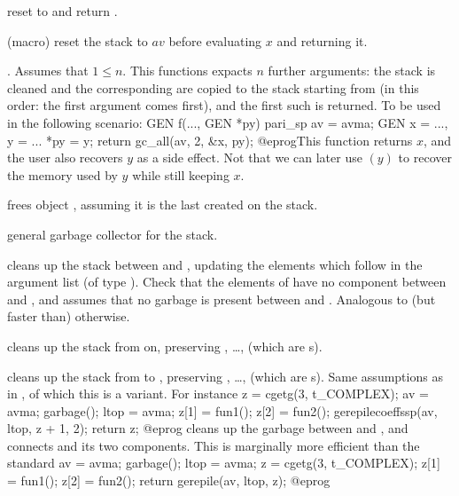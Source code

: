 reset  to  and return
.

 (macro) reset the stack to $av$
before evaluating $x$ and returning it.

. Assumes that $1 \leq n$. This
functions expacts $n$ further 
arguments: the stack is cleaned and the corresponding  are
copied to the stack starting from  (in this order: the first argument
comes first), and the first such  is returned. To be used in the
following scenario:
\bprog
  GEN f(..., GEN *py)
  {
    pari_sp av = avma;
    GEN x = ..., y = ...
    *py = y; return gc_all(av, 2, &x, py);
  }
@eprog\noindent This function returns $x$, and the user also recovers $y$
as a side effect. Not that we can later use $(y)$ to recover the
memory used by $y$ while still keeping $x$.

 frees object , assuming it is the last created
on the stack.

 general garbage collector
for the stack.

cleans up the stack between  and , updating
the  elements which follow  in the argument list (of type
). Check that the elements of  have no component between
 and , and assumes that no garbage is present between
 and . Analogous to (but faster than) 
otherwise.

 cleans up the stack
from  on, preserving , \dots,  (which are
s).

cleans up the stack from  to , preserving ,
\dots,  (which are s). Same assumptions as in
, of which this is a variant. For instance
\bprog
  z = cgetg(3, t_COMPLEX);
  av = avma; garbage(); ltop = avma;
  z[1] = fun1();
  z[2] = fun2();
  gerepilecoeffssp(av, ltop, z + 1, 2);
  return z;
@eprog\noindent
cleans up the garbage between  and , and connects 
and its two components. This is marginally more efficient than the standard
\bprog
  av = avma; garbage(); ltop = avma;
  z = cgetg(3, t_COMPLEX);
  z[1] = fun1();
  z[2] = fun2(); return gerepile(av, ltop, z);
@eprog\noindent

